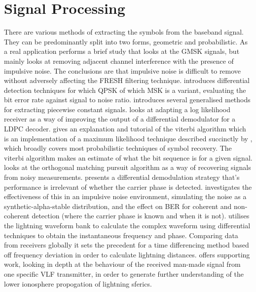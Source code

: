 \section{Signal Processing}
There are various methods of extracting the symbols from the baseband signal. They can be predominantly split into two forms, geometric and probabilistic. 
As a real application \cite{Adlard1999} performs a brief study that looks at the GMSK signals, but mainly looks at removing adjacent channel interference with the presence of impulsive noise. The conclusions are that impulsive noise is difficult to remove without adversely affecting the FRESH filtering technique.
\cite{Park2011} introduces differential detection techniques for which QPSK of which MSK is a variant, evaluating the bit error rate against signal to noise ratio.
\cite{Little2011} introduces several generalised methods for extracting piecewise constant signals.
\cite{Wiklundh2015} looks at adapting a log likelihood receiver as a way of improving the output of a differential demodulator for a LDPC decoder. \cite{Forney1973} gives an explanation and tutorial of the viterbi algorithm which is an implementation of a maximum likelihood technique described succinctly by \cite{weisstein}, which broadly covers most probabilistic techniques of symbol recovery. The viterbi algorithm makes an estimate of what the bit sequence is for a given signal. \cite{Shen2015} looks at the orthogonal matching pursuit algorithm as a way of recovering signals from noisy measurements. \cite{Yue2016} presents a differential demodulation strategy that's performance is irrelevant of whether the carrier phase is detected.\cite{Yang2016} investigates the effectiveness of this in an impulsive noise environment, simulating the noise as a synthetic-alpha-stable distribution, and the effect on BER for coherent and non-coherent detection (where the carrier phase is known and when it is not). 
\cite{Liu2018} utilises the lightning waveform bank to calculate the complex waveform using differential techniques to obtain the instantaneous frequency and phase. Comparing data from receivers globally it sets the precedent for a time differencing method based off frequency deviation in order to calculate lightning distances. \cite{Koh2018} offers supporting work, looking in depth at the behaviour of the received man-made signal from one specific VLF transmitter, in order to generate further understanding of the lower ionosphere propogation of lightning sferics.

